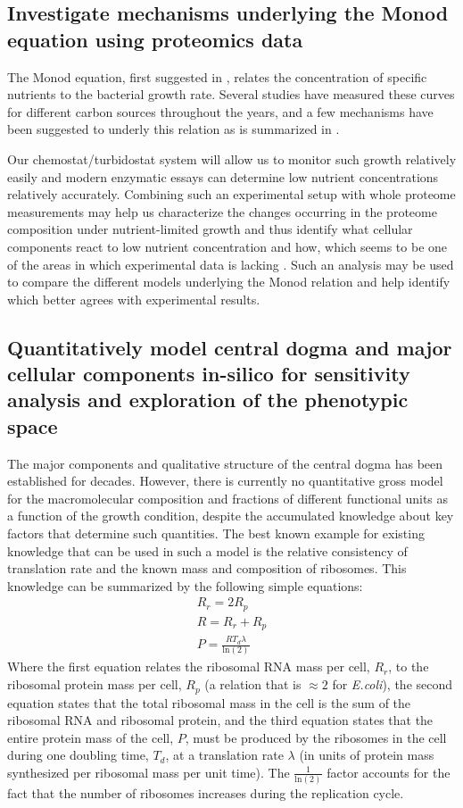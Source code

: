 \documentclass[notitlepage]{article}
\begin{document}
\subsection{Investigate mechanisms underlying the Monod equation using proteomics data}
The Monod equation, first suggested in \cite{Monod1949}, relates the concentration of specific nutrients to the bacterial growth rate.
Several studies have measured these curves for different carbon sources throughout the years, and a few mechanisms have been suggested to underly this relation as is summarized in \cite{Senn1994}.

Our chemostat/turbidostat system will allow us to monitor such growth relatively easily and modern enzymatic essays can determine low nutrient concentrations relatively accurately.
Combining such an experimental setup with whole proteome measurements may help us characterize the changes occurring in the proteome composition under nutrient-limited growth and thus identify what cellular components react to low nutrient concentration and how, which seems to be one of the areas in which experimental data is lacking \cite{Ferenci1999a}.
Such an analysis may be used to compare the different models underlying the Monod relation and help identify which better agrees with experimental results.

\subsection{Quantitatively model central dogma and major cellular components in-silico for sensitivity analysis and exploration of the phenotypic space}
The major components and qualitative structure of the central dogma has been established for decades.
However, there is currently no quantitative gross model for the macromolecular composition and fractions of different functional units as a function of the growth condition, despite the accumulated knowledge about key factors that determine such quantities.
The best known example for existing knowledge that can be used in such a model is the relative consistency of translation rate and the known mass and composition of ribosomes.
This knowledge can be summarized by the following simple equations:
\begin{eqnarray}
    R_r=2R_p \\
    R=R_r+R_p \\
    P=\frac{RT_d\lambda}{\text{ln}(2)}
\end{eqnarray}
Where the first equation relates the ribosomal RNA mass per cell, $R_r$, to the ribosomal protein mass per cell, $R_p$ (a relation that is $\approx 2$ for \emph{E.coli}), the second equation states that the total ribosomal mass in the cell is the sum of the ribosomal RNA and ribosomal protein, and the third equation states that the entire protein mass of the cell, $P$, must be produced by the ribosomes in the cell during one doubling time, $T_d$, at a translation rate $\lambda$ (in units of protein mass synthesized per ribosomal mass per unit time).
The $\frac{1}{\text{ln}(2)}$ factor accounts for the fact that the number of ribosomes increases during the replication cycle.
\end{document}
